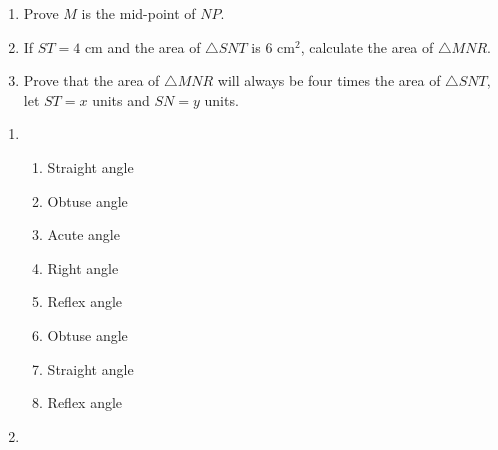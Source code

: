 \begin{eocexercises}{}
\begin{enumerate}[itemsep=20pt, label=\textbf{\arabic*}.]
\begin{center}
{}
\end{center}
\begin{enumerate}[noitemsep, label=\textbf{(\alph*)} ]
\item Prove $M$ is the mid-point of $NP$.
\item If $ST=4$ cm and the area of $\triangle SNT$ is $6$ cm$^2$, calculate the area of $\triangle MNR$.
\item Prove that the area of $\triangle MNR$ will always be four times the area of $\triangle SNT$, let $ST=x$ units and $SN=y$ units.
\end{enumerate}
\end{enumerate}

\end{eocexercises}


 \begin{eocsolutions}{}{
\begin{enumerate}[itemsep=5pt, label=\textbf{\arabic*}. ] 


\item %
	  \begin{enumerate}[noitemsep, label=\textbf{(\alph*)} ]
		\item Straight angle
\item Obtuse angle
\item Acute angle
\item Right angle
\item Reflex angle
\item Obtuse angle
\item Straight angle
\item Reflex angle
	  \end{enumerate}
\item %
      \begin{enumerate}[noitemsep, label=\textbf{(\alph*)} ]


\end{enumerate}
\end{enumerate}}
\end{eocsolutions}
